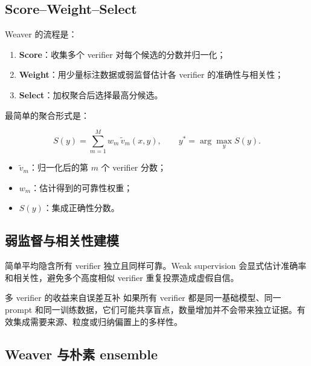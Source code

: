 \documentclass[a4paper]{article}
\begin{document}

\subsection{Score--Weight--Select}

Weaver 的流程是：

\begin{enumerate}
    \item \textbf{Score}：收集多个 verifier 对每个候选的分数并归一化；
    \item \textbf{Weight}：用少量标注数据或弱监督估计各 verifier 的准确性与相关性；
    \item \textbf{Select}：加权聚合后选择最高分候选。
\end{enumerate}


最简单的聚合形式是：

$$
S(y)=\sum_{m=1}^{M} w_m\,\tilde v_m(x,y),
\qquad
 y^*=\arg\max_y S(y).
$$

\begin{itemize}
    \item $\tilde v_m$：归一化后的第 $m$ 个 verifier 分数；
    \item $w_m$：估计得到的可靠性权重；
    \item $S(y)$：集成正确性分数。
\end{itemize}

\subsection{弱监督与相关性建模}

简单平均隐含所有 verifier 独立且同样可靠。Weak supervision 会显式估计准确率和相关性，避免多个高度相似 verifier 重复投票造成虚假自信。


\begin{importantbox}{多 verifier 的收益来自误差互补}
如果所有 verifier 都是同一基础模型、同一 prompt 和同一训练数据，它们可能共享盲点，数量增加并不会带来独立证据。有效集成需要来源、粒度或归纳偏置上的多样性。
\end{importantbox}

\subsection{Weaver 与朴素 ensemble}
\end{document}
